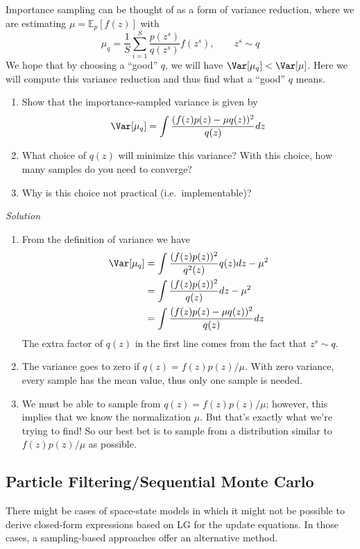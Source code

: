 \documentclass{article}
\begin{document}
\begin{exercise}
Importance sampling can be thought of as a form of variance reduction, where we are estimating $\mu = \mathbb{E}_p[f(z)]$ with
\[ \mu_q = \frac{1}{S} \sum_{i=1}^S\frac{p(z^s)}{q(z^s)}f(z^s), \qquad z^s \sim q \]
We hope that by choosing a ``good'' $q$, we will have $\Var[\mu_q] < \Var[\mu]$.  Here we will compute this variance reduction and thus find what a ``good'' $q$ means.
\begin{enumerate}
\item Show that the importance-sampled variance is given by
\[ \Var[\mu_q] = \int \frac{(f(z)p(z) - \mu q(z))^2}{q(z)} dz \]
\item What choice of $q(z)$ will minimize this variance?  With this choice, how many samples do you need to converge?
\item Why is this choice not practical (i.e.~implementable)?
\end{enumerate}

\textit{Solution}
\begin{enumerate}
\item From the definition of variance we have
\begin{align*}
\Var[\mu_q] &= \int \frac{(f(z)p(z))^2}{q^2(z)} q(z)dz - \mu^2 \\
			&= \int \frac{(f(z)p(z))^2}{q(z)} dz - \mu^2 \\
			&= \int \frac{(f(z)p(z) - \mu q(z))^2}{q(z)} dz \\
\end{align*}
The extra factor of $q(z)$ in the first line comes from the fact that $z^s \sim q$.

\item The variance goes to zero if $q(z) = f(z)p(z)/\mu$.  With zero variance, every sample has the mean value, thus only one sample is needed.
\item We must be able to sample from $q(z) = f(z)p(z)/\mu$; however, this implies that we know the normalization $\mu$.  But that's exactly what we're trying to find! So our best bet is to sample from a distribution similar to $f(z)p(z)/\mu$ as possible.
\end{enumerate}

\end{exercise}


\subsection{Particle Filtering/Sequential Monte Carlo}
There might be cases of space-state models in which it might not be possible to derive closed-form expressions based on LG for the update equations. In those cases, a sampling-based approaches offer an alternative method. 
\end{document}
